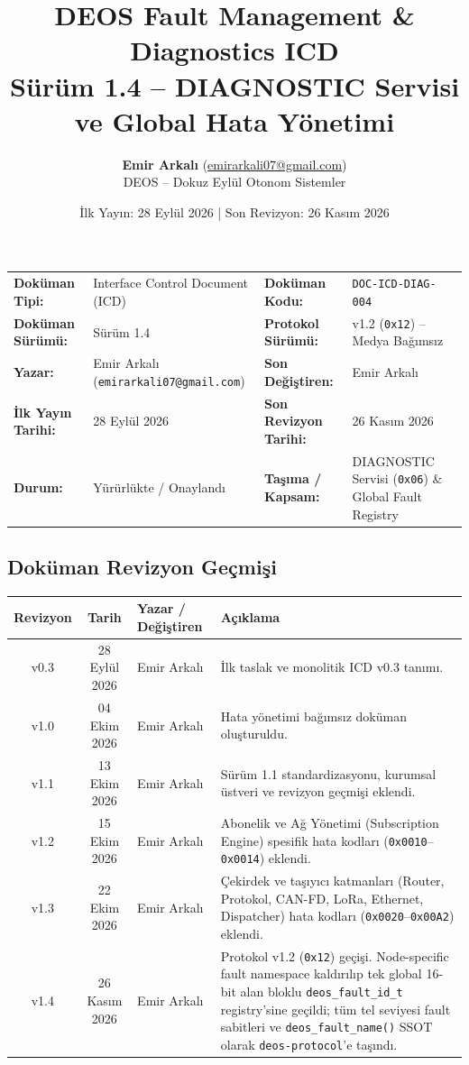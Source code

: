 \documentclass[a4paper,11pt]{article}
\title{\textbf{DEOS Fault Management \& Diagnostics ICD}\\
\large Sürüm 1.4 -- DIAGNOSTIC Servisi ve Global Hata Yönetimi}
\author{\textbf{Emir Arkalı} (\href{mailto:emirarkali07@gmail.com}{emirarkali07@gmail.com})\\DEOS -- Dokuz Eylül Otonom Sistemler}
\date{İlk Yayın: 28 Eylül 2026 \quad | \quad Son Revizyon: 26 Kasım 2026}
\newcommand{\hex}[1]{\texttt{0x#1}}
\newcommand{\code}[1]{\texttt{#1}}
\begin{document}
\maketitle

\begin{center}
\small
\begin{tabularx}{\textwidth}{ll lX}
\toprule
\textbf{Doküman Tipi:} & Interface Control Document (ICD) & \textbf{Doküman Kodu:} & \code{DOC-ICD-DIAG-004} \\
\textbf{Doküman Sürümü:} & Sürüm 1.4 & \textbf{Protokol Sürümü:} & v1.2 (\hex{12}) -- Medya Bağımsız \\
\textbf{Yazar:} & Emir Arkalı (\texttt{emirarkali07@gmail.com}) & \textbf{Son Değiştiren:} & Emir Arkalı \\
\textbf{İlk Yayın Tarihi:} & 28 Eylül 2026 & \textbf{Son Revizyon Tarihi:} & 26 Kasım 2026 \\
\textbf{Durum:} & Yürürlükte / Onaylandı & \textbf{Taşıma / Kapsam:} & DIAGNOSTIC Servisi (\hex{06}) \& Global Fault Registry \\
\bottomrule
\end{tabularx}
\end{center}

\subsection*{Doküman Revizyon Geçmişi}
\begin{center}
\small
\begin{tabularx}{\textwidth}{c c l X}
\toprule
\textbf{Revizyon} & \textbf{Tarih} & \textbf{Yazar / Değiştiren} & \textbf{Açıklama} \\
\midrule
v0.3 & 28 Eylül 2026 & Emir Arkalı & İlk taslak ve monolitik ICD v0.3 tanımı. \\
v1.0 & 04 Ekim 2026 & Emir Arkalı & Hata yönetimi bağımsız doküman oluşturuldu. \\
v1.1 & 13 Ekim 2026 & Emir Arkalı & Sürüm 1.1 standardizasyonu, kurumsal üstveri ve revizyon geçmişi eklendi. \\
v1.2 & 15 Ekim 2026 & Emir Arkalı & Abonelik ve Ağ Yönetimi (Subscription Engine) spesifik hata kodları (\hex{0010}--\hex{0014}) eklendi. \\
v1.3 & 22 Ekim 2026 & Emir Arkalı & Çekirdek ve taşıyıcı katmanları (Router, Protokol, CAN-FD, LoRa, Ethernet, Dispatcher) hata kodları (\hex{0020}--\hex{00A2}) eklendi. \\
v1.4 & 26 Kasım 2026 & Emir Arkalı & Protokol v1.2 (\hex{12}) geçişi. Node-specific fault namespace kaldırılıp tek global 16-bit alan bloklu \code{deos\_fault\_id\_t} registry'sine geçildi; tüm tel seviyesi fault sabitleri ve \code{deos\_fault\_name()} SSOT olarak \code{deos-protocol}'e taşındı. \\
\bottomrule
\end{tabularx}
\end{center}
\vspace{0.8em}
\end{document}
